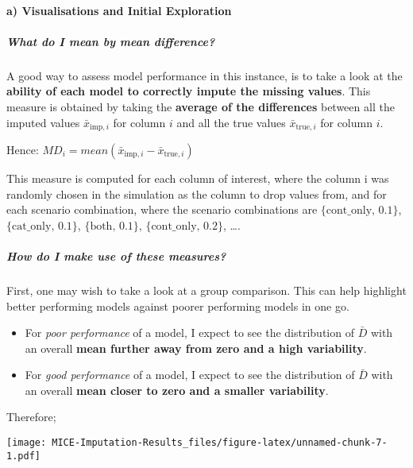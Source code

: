 \documentclass[]{article}
\providecommand{\tightlist}{%
  \setlength{\itemsep}{0pt}\setlength{\parskip}{0pt}}
\let\oldparagraph\paragraph
\renewcommand{\paragraph}[1]{\oldparagraph{#1}\mbox{}}
\let\oldsubparagraph\subparagraph
\renewcommand{\subparagraph}[1]{\oldsubparagraph{#1}\mbox{}}
\begin{document}
\hypertarget{a-visualisations-and-initial-exploration}{%
\paragraph{a) Visualisations and Initial
Exploration}\label{a-visualisations-and-initial-exploration}}

\hypertarget{what-do-i-mean-by-mean-difference}{%
\subparagraph{What do I mean by mean
difference?}\label{what-do-i-mean-by-mean-difference}}

A good way to assess model performance in this instance, is to take a
look at the \textbf{ability of each model to correctly impute the
missing values}. This measure is obtained by taking the \textbf{average
of the differences} between all the imputed values
\(\bar{x}_{\text{imp}, i}\) for column \(i\) and all the true values
\(\bar{x}_{\text{true}, i}\) for column \(i\).

Hence:
\(MD_i = mean(\bar{x}_{\text{imp}, i} - \bar{x}_{\text{true}, i})\)

This measure is computed for each column of interest, where the column i
was randomly chosen in the simulation as the column to drop values from,
and for each scenario combination, where the scenario combinations are
\(\text{\{cont_only, 0.1\}}\), \(\text{\{cat_only, 0.1\}}\),
\(\text{\{both, 0.1\}}\), \(\text{\{cont_only, 0.2\}}\), \ldots{}.

\hypertarget{how-do-i-make-use-of-these-measures}{%
\subparagraph{How do I make use of these
measures?}\label{how-do-i-make-use-of-these-measures}}

First, one may wish to take a look at a group comparison. This can help
highlight better performing models against poorer performing models in
one go.

\begin{itemize}
\tightlist
\item
  For \emph{poor performance} of a model, I expect to see the
  distribution of \(\bar{D}\) with an overall \textbf{mean further away
  from zero and a high variability}.
\item
  For \emph{good performance} of a model, I expect to see the
  distribution of \(\bar{D}\) with an overall \textbf{mean closer to
  zero and a smaller variability}.
\end{itemize}

Therefore;

\texttt{[image: MICE-Imputation-Results\_files/figure-latex/unnamed-chunk-7-1.pdf]}
\end{document}
